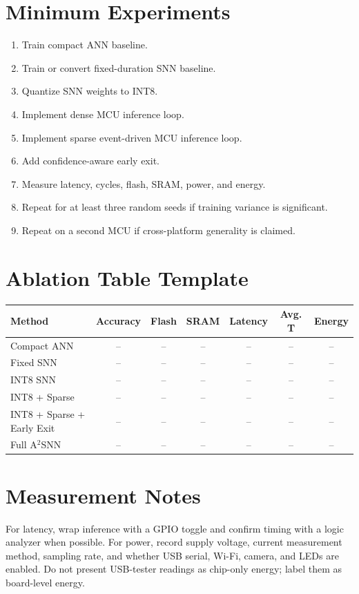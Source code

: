 \documentclass[11pt]{article}
\begin{document}
\section*{Minimum Experiments}
\begin{enumerate}
    \item Train compact ANN baseline.
    \item Train or convert fixed-duration SNN baseline.
    \item Quantize SNN weights to INT8.
    \item Implement dense MCU inference loop.
    \item Implement sparse event-driven MCU inference loop.
    \item Add confidence-aware early exit.
    \item Measure latency, cycles, flash, SRAM, power, and energy.
    \item Repeat for at least three random seeds if training variance is significant.
    \item Repeat on a second MCU if cross-platform generality is claimed.
\end{enumerate}

\section*{Ablation Table Template}
\begin{tabular}{lcccccc}
\toprule
Method & Accuracy & Flash & SRAM & Latency & Avg. T & Energy \\
\midrule
Compact ANN & -- & -- & -- & -- & -- & -- \\
Fixed SNN & -- & -- & -- & -- & -- & -- \\
INT8 SNN & -- & -- & -- & -- & -- & -- \\
INT8 + Sparse & -- & -- & -- & -- & -- & -- \\
INT8 + Sparse + Early Exit & -- & -- & -- & -- & -- & -- \\
Full A$^2$SNN & -- & -- & -- & -- & -- & -- \\
\bottomrule
\end{tabular}

\section*{Measurement Notes}
For latency, wrap inference with a GPIO toggle and confirm timing with a logic analyzer when possible. For power, record supply voltage, current measurement method, sampling rate, and whether USB serial, Wi-Fi, camera, and LEDs are enabled. Do not present USB-tester readings as chip-only energy; label them as board-level energy.
\end{document}
